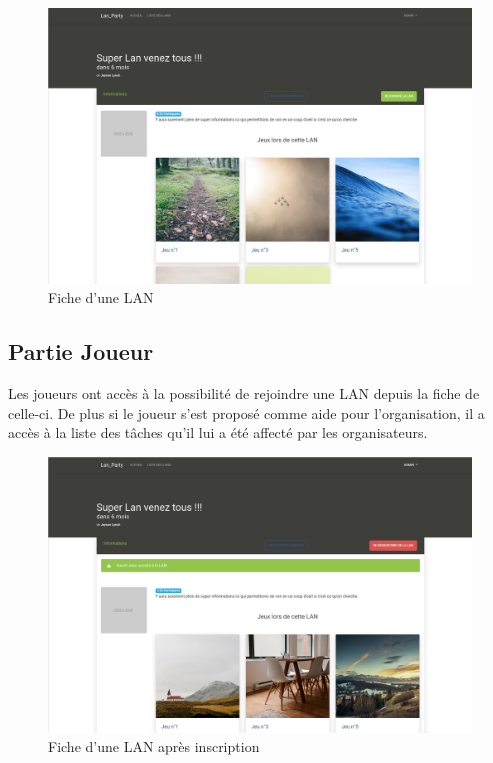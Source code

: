 \documentclass[12pt]{article}
\begin{document}
\begin{figure}[H]
\centering
\includegraphics[scale=0.20]{images/fiche_lan.png}
\caption{Fiche d'une LAN}
\label{}
\end{figure}

\subsection{Partie Joueur}

Les joueurs ont accès à la possibilité de rejoindre une LAN depuis la fiche de celle-ci. De plus si le joueur s'est proposé comme aide pour l'organisation, il a accès à la liste des tâches qu'il lui a été affecté par les organisateurs.

\begin{figure}[H]
\centering
\includegraphics[scale=0.20]{images/inscrit.png}
\caption{Fiche d'une LAN après inscription}
\label{}
\end{figure}
\end{document}
